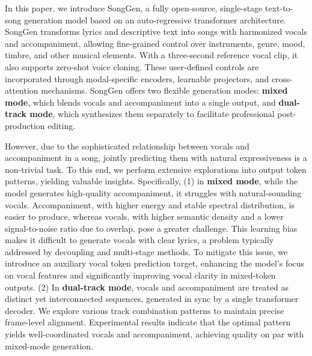 In this paper, we introduce SongGen, a fully open-source, single-stage text-to-song generation model based on an auto-regressive transformer architecture. SongGen transforms lyrics and descriptive text into songs with harmonized vocals and accompaniment, allowing fine-grained control over instruments, genre, mood, timbre, and other musical elements. With a three-second reference vocal clip, it also supports zero-shot voice cloning. These user-defined controls are incorporated through modal-specific encoders, learnable projectors, and cross-attention mechanisms.  
SongGen offers two flexible generation modes: \textbf{mixed mode}, which blends vocals and accompaniment into a single output, and \textbf{dual-track mode}, which synthesizes them separately to facilitate professional post-production editing.

However, due to the sophisticated relationship between vocals and accompaniment in a song, jointly predicting them with natural expressiveness is a non-trivial task. To this end, we perform extensive explorations into output token patterns, yielding valuable insights. Specifically, (1) in \textbf{mixed mode}, while the model generates high-quality accompaniment, it struggles with natural-sounding vocals. Accompaniment, with higher energy and stable spectral distribution, is easier to produce, whereas vocals, with higher semantic density and a lower signal-to-noise ratio due to overlap, pose a greater challenge. This learning bias makes it difficult to generate vocals with clear lyrics, a problem typically addressed by decoupling and multi-stage methods. To mitigate this issue, we introduce an auxiliary vocal token prediction target, enhancing the model’s focus on vocal features and significantly improving vocal clarity in mixed-token outputs. (2) In \textbf{dual-track mode}, vocals and accompaniment are treated as distinct yet interconnected sequences, generated in sync by a single transformer decoder. We explore various track combination patterns to maintain precise frame-level alignment. Experimental results indicate that the optimal pattern yields well-coordinated vocals and accompaniment, achieving quality on par with mixed-mode generation.



